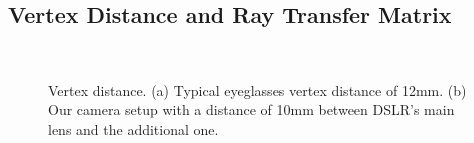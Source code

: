 
\subsection{Vertex Distance and Ray Transfer Matrix}
\label{subsec:ABCDMatrix}

\begin{figure}[!b]
	\centering

	~
	
	\caption[Vertex distance and our optical setup]{Vertex distance. (a) Typical eyeglasses vertex distance of 12mm. (b) Our camera setup with a distance of 10mm between DSLR's main lens and the additional one.}
	\label{fig:rtm}
\end{figure}

